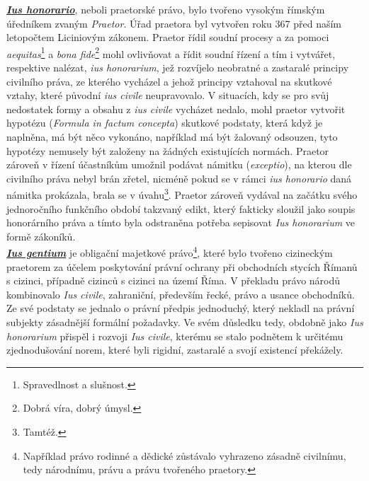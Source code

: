\documentclass{article}
\begin{document}


\underline{\textbf{\textit{Ius honorario}}}, neboli praetorské právo, bylo tvořeno vysokým římským úředníkem zvaným \textit{Praetor}. Úřad praetora byl vytvořen roku 367 před naším letopočtem Liciniovým zákonem. Praetor řídil soudní procesy a za pomoci \textit{aequitas}\footnote{Spravedlnost a slušnost.} a \textit{bona fide}\footnote{Dobrá víra, dobrý úmysl.} mohl ovlivňovat a řídit soudní řízení a tím i vytvářet, respektive nalézat, \textit{ius honorarium}, jež rozvíjelo neobratné a zastaralé principy civilního práva, ze kterého vycházel a jehož principy vztahoval na skutkové vztahy, které původní \textit{ius civile} neupravovalo. V situacích, kdy se pro svůj nedostatek formy a obsahu z \textit{ius civile} vycházet nedalo, mohl praetor vytvořit hypotézu (\textit{Formula in factum concepta}) skutkové podstaty, která když je naplněna, má být něco vykonáno, například má být žalovaný odsouzen, tyto hypotézy nemusely být založeny na žádných existujících normách. Praetor zároveň v řízení účastníkům umožnil podávat námitku (\textit{exceptio}), na kterou dle civilního práva nebyl brán zřetel, nicméně pokud se v rámci \textit{ius honorario} daná námitka prokázala, brala se v úvahu\footnote{Tamtéž.}. Praetor zároveň vydával na začátku svého jednoročního funkčního období takzvaný edikt, který fakticky sloužil jako soupis honorárního práva a tímto byla odstraněna potřeba sepisovat \textit{Ius honorarium} ve formě zákoníků. \\


\underline{\textbf{\textit{Ius gentium}}} je obligační majetkové právo\footnote{Například právo rodinné a dědické zůstávalo vyhrazeno zásadně civilnímu, tedy národnímu, právu a právu tvořeného praetory.}, které bylo tvořeno cizineckým praetorem za účelem poskytování právní ochrany při obchodních stycích Římanů s cizinci, případně cizinců s cizinci na území Říma. V překladu právo národů kombinovalo \textit{Ius civile}, zahraniční, především řecké, právo a usance obchodníků. Ze své podstaty se jednalo o právní předpis jednoduchý, který nekladl na právní subjekty zásadnější formální požadavky. Ve svém důsledku tedy, obdobně jako \textit{Ius honorarium} přispěl i rozvoji \textit{Ius civile}, kterému se stalo podnětem k určitému zjednodušování norem, které byli rigidní, zastaralé a svojí existencí překážely.\\
\end{document}
